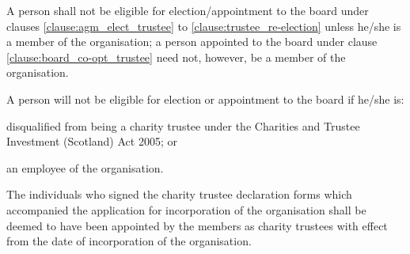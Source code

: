 ﻿\documentclass[a4paper,11pt,onecolumn ]{article}
\begin{document}
\begin{legal}
\item A person shall not be eligible for election/appointment to the board under clauses \ref{clause:agm_elect_trustee} to \ref{clause:trustee_re-election} unless he/she is a member of the organisation; a person appointed to the board under clause \ref{clause:board_co-opt_trustee} need not, however, be a member of the organisation.
\item \label{clause:ineligible_trustee} A person will not be eligible for election or appointment to the board if he/she is:
    \begin{legal}
    \item disqualified from being a charity trustee under the Charities and Trustee Investment (Scotland) Act 2005; or
    \item an employee of the organisation.
    \end{legal}
\end{legal}

\begin{legal}
\item \label{clause:initial_trustees} The individuals who signed the charity trustee declaration forms which accompanied the application for incorporation of the organisation shall be deemed to have been appointed by the members as charity trustees with effect from the date of incorporation of the organisation.
\end{legal}
\end{document}
